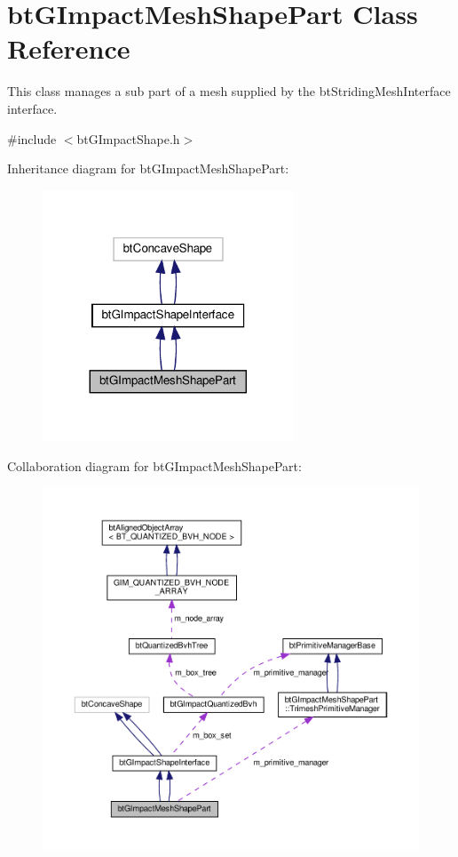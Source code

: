 \hypertarget{classbtGImpactMeshShapePart}{}\section{bt\+G\+Impact\+Mesh\+Shape\+Part Class Reference}
\label{classbtGImpactMeshShapePart}


This class manages a sub part of a mesh supplied by the bt\+Striding\+Mesh\+Interface interface.  




{\ttfamily \#include $<$bt\+G\+Impact\+Shape.\+h$>$}



Inheritance diagram for bt\+G\+Impact\+Mesh\+Shape\+Part\+:
\nopagebreak
\begin{figure}[H]
\begin{center}
\leavevmode
\includegraphics[width=212pt]{classbtGImpactMeshShapePart__inherit__graph}
\end{center}
\end{figure}


Collaboration diagram for bt\+G\+Impact\+Mesh\+Shape\+Part\+:
\nopagebreak
\begin{figure}[H]
\begin{center}
\leavevmode
\includegraphics[width=350pt]{classbtGImpactMeshShapePart__coll__graph}
\end{center}
\end{figure}
